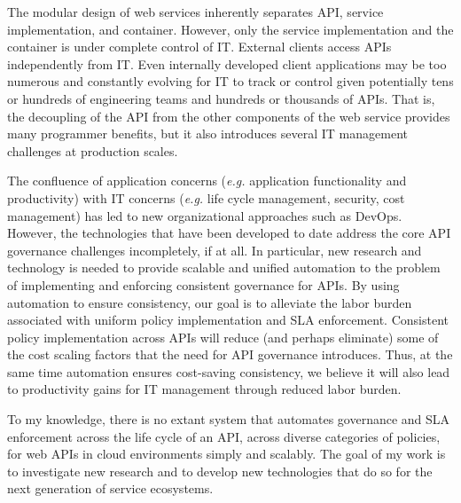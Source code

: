 The modular design of web services inherently separates API, 
service implementation, and container. However, only 
the service implementation and the container is under complete
control of IT. External clients access APIs independently from IT.
Even internally developed client applications may be too numerous and
constantly evolving for IT to track or control given
potentially tens or hundreds of engineering teams and hundreds or 
thousands of APIs.  That is, the decoupling of the API from the 
other components of the web service provides many programmer
benefits, but it also introduces several IT management challenges 
at production scales. 

The confluence of application concerns ({\em e.g.} 
application functionality and productivity) with IT 
concerns ({\em e.g.} life cycle management, security, 
cost management) has led to new organizational approaches such as
DevOps.  However, 
the technologies that have been developed
to date address the core API
governance challenges incompletely, if at all. 
In particular, new research and technology is needed 
to provide scalable and unified automation to the problem
of implementing and enforcing consistent governance for APIs. 
By using automation to ensure consistency, our goal is to alleviate the 
labor burden associated with uniform policy implementation and SLA enforcement.  
Consistent policy implementation across APIs will reduce (and perhaps
eliminate) some of the cost scaling factors that the need for API governance
introduces.  Thus, at the same time automation ensures cost-saving
consistency, we believe it will also lead to productivity gains for 
IT management through reduced labor burden.

To my knowledge, there is no extant system that automates governance and
SLA enforcement across the life cycle
of an API, across diverse categories of policies, for web
APIs in cloud environments simply and scalably.  The goal of my work is to investigate 
new research and to develop
new technologies that do so for the next generation of service ecosystems.